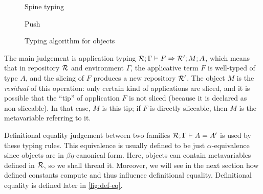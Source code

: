 \documentclass[9pt]{sigplanconf}
\begin{document}
\begin{figure*}
  \begin{mathpar}

  \end{mathpar}

  \qquad
  {Spine typing}

  \begin{mathpar}

  \end{mathpar}

  \qquad
  {Push}

  \begin{mathpar}
  \end{mathpar}

  \caption{Typing algorithm for objects}
  \label{fig:obj-typing}
\end{figure*}

The main judgement is application typing $\jf\mr\Gamma F \mmr M A$,
which means that in repository $\mr$ and environment $\Gamma$, the
applicative term $F$ is well-typed of type $A$, and the slicing of $F$
produces a new repository $\mmr$. The object $M$ is the
\emph{residual} of this operation: only certain kind of applications
are sliced, and it is possible that the ``tip'' of application $F$ is
not sliced (because it is declared as non-sliceable). In that case,
$M$ is this tip; if $F$ is directly sliceable, then $M$ is the
metavariable referring to it.

Definitional equality judgement between two families $\jea\mr\Gamma A
{A'}$ is used by these typing rules. This equivalence is usually
defined to be just $\alpha$-equivalence since objects are in
$\beta\eta$-canonical form. Here, objects can contain metavariables
defined in $\mr$, so we shall thread it. Moreover, we will see in the
next section how defined constants compute and thus influence
definitional equality. Definitional equality is defined later in
\ref{fig:def-eq}.
\end{document}
